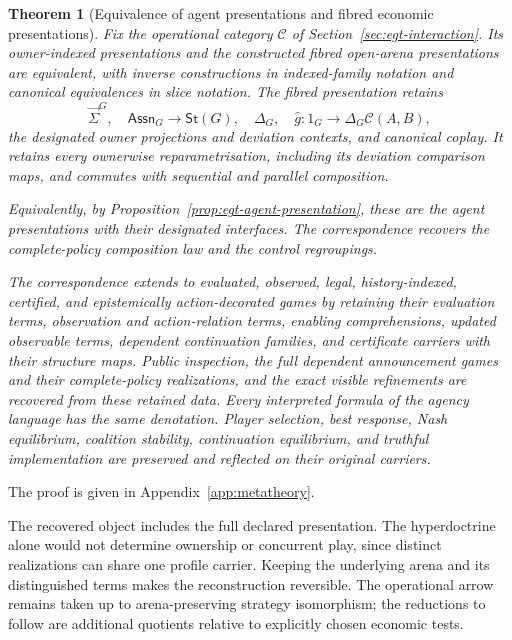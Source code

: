 \documentclass[11pt,a4paper]{article}
\numberwithin{equation}{section}
\newtheorem{theorem}{Theorem}[section]
\theoremstyle{definition}
\theoremstyle{remark}
\theoremstyle{plain}
\begin{document}
\begin{theorem}[Equivalence of agent presentations and fibred economic presentations]
\label{thm:cgt-lossless}\label{thm:fib-reconstruction}
Fix the operational category $\mathcal C$ of
Section~\ref{sec:egt-interaction}. Its owner-indexed presentations
and the constructed fibred open-arena presentations are equivalent,
with inverse constructions in indexed-family notation and canonical
equivalences in slice notation. The fibred presentation retains
\[
 \vec\Sigma^G,\quad
 \mathsf{Assn}_G\longrightarrow\mathsf{St}(G),\quad
 \Delta_G,\quad\widehat g:1_G\longrightarrow
             \Delta_G\mathcal C(A,B),
\]
the designated owner projections and deviation contexts, and canonical
coplay. It retains every ownerwise reparametrisation, including its
deviation comparison maps, and commutes with sequential and parallel
composition.

Equivalently, by Proposition~\ref{prop:egt-agent-presentation}, these are
the agent presentations with their designated interfaces. The correspondence
recovers the complete-policy composition law and the control regroupings.

The correspondence extends to evaluated, observed, legal,
history-indexed, certified, and epistemically action-decorated games by
retaining their evaluation terms, observation and action-relation terms,
enabling comprehensions, updated observable terms, dependent continuation
families, and certificate carriers with their structure maps. Public
inspection, the full dependent announcement games and their complete-policy
realizations, and the exact visible
refinements are recovered from these retained data. Every interpreted
formula of the agency language has the same denotation.
Player selection, best response, Nash equilibrium, coalition stability,
continuation equilibrium, and truthful implementation are preserved
and reflected on their original carriers.
\end{theorem}

\par\noindent The proof is given in Appendix~\ref{app:metatheory}.

The recovered object includes the full declared presentation.
The hyperdoctrine alone would not determine ownership or concurrent
play, since distinct realizations can share one profile carrier.
Keeping the underlying arena and its distinguished terms makes the
reconstruction reversible. The operational arrow remains taken up to
arena-preserving strategy isomorphism; the reductions to follow are
additional quotients relative to explicitly chosen economic tests.
\end{document}
